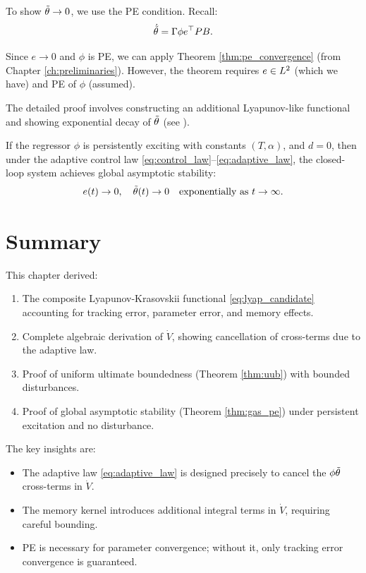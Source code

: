 To show $\tilde{\theta} \to 0$, we use the PE condition. Recall:
\begin{equation}
    \dot{\tilde{\theta}} = \Gamma \phi e^\top P B.
\end{equation}

Since $e \to 0$ and $\phi$ is PE, we can apply Theorem \ref{thm:pe_convergence} (from Chapter \ref{ch:preliminaries}). However, the theorem requires $e \in L^{2}$ (which we have) and PE of $\phi$ (assumed).

The detailed proof involves constructing an additional Lyapunov-like functional and showing exponential decay of $\tilde{\theta}$ (see \cite{Ioannou2006, Narendra1989}).

\begin{theorem}
\label{thm:gas_pe}
If the regressor $\phi$ is persistently exciting with constants $(T, \alpha)$, and $d = 0$, then under the adaptive control law \eqref{eq:control_law}--\eqref{eq:adaptive_law}, the closed-loop system achieves global asymptotic stability:
\begin{equation}
    e(t) \to 0, \quad \tilde{\theta}(t) \to 0 \quad \text{exponentially as } t \to \infty.
\end{equation}
\end{theorem}

\section{Summary}

This chapter derived:
\begin{enumerate}
    \item The composite Lyapunov-Krasovskii functional \eqref{eq:lyap_candidate} accounting for tracking error, parameter error, and memory effects.
    \item Complete algebraic derivation of $\dot{V}$, showing cancellation of cross-terms due to the adaptive law.
    \item Proof of uniform ultimate boundedness (Theorem \ref{thm:uub}) with bounded disturbances.
    \item Proof of global asymptotic stability (Theorem \ref{thm:gas_pe}) under persistent excitation and no disturbance.
\end{enumerate}

The key insights are:
\begin{itemize}
    \item The adaptive law \eqref{eq:adaptive_law} is designed precisely to cancel the $\phi \tilde{\theta}$ cross-terms in $\dot{V}$.
    \item The memory kernel introduces additional integral terms in $\dot{V}$, requiring careful bounding.
    \item PE is necessary for parameter convergence; without it, only tracking error convergence is guaranteed.
\end{itemize}
